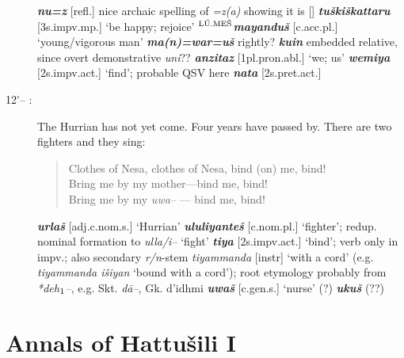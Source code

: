 \documentclass[10pt]{article}
\newcommand{\supersc}[1]{$^{\textrm{\scriptsize{#1}}}$}  	%
\newcommand{\subsc}[1]{$_{\textrm{\scriptsize{#1}}}$}	%
\newcommand{\bit}[1]{\textbf{\textit{#1}}}				%
\newcommand{\p}[1]{{\tiny[{#1}]}}					%
\newcommand{\hi}{h\subsc{1}}								%
\newcommand{\pr}{\'{ }}									%
\newcommand{\hith}{\textsubwedge{h}}
\newcommand{\men}{\supersc{L\'U.ME\v{S}}}
\renewcommand{\.}[1]{\textsubdot{#1}}
\begin{document}
\begin{description}
\begin{notes}

\bit{nu=z} \p{refl.} nice archaic spelling of \textit{=z(a)} showing it is [\texttslig] \bit{tu\v{s}ki\v{s}kattaru} \p{3s.impv.mp.} `be happy; rejoice' \textbf{\men}\bit{mayandu\v{s}} \p{c.acc.pl.} `young/vigorous man' \bit{ma(n)=war=u\v{s}} rightly? \bit{kuin} embedded relative, since overt demonstrative \textit{uni}?? \bit{anzitaz} \p{1pl.pron.abl.} `we; us' \bit{wemiya} \p{2s.impv.act.} `find'; probable QSV here  \bit{na{\hith}ta} \p{2s.pret.act.}

\end{notes}

\item[12{\pr}-- :] The Hurrian has not yet come. Four years have passed by. There are two fighters and they sing:

\begin{verse}
Clothes of Nesa, clothes of Nesa, bind (on) me, bind! \\
Bring me by my mother---bind me, bind! \\
Bring me by my \textit{uwa--} --- bind me, bind! \\
\end{verse}


\begin{notes}

\bit{{\hith}urla\v{s}} \p{adj.c.nom.s.} `Hurrian' \bit{{\hith}ul{\hith}uliyante\v{s}} \p{c.nom.pl.} `fighter'; redup. nominal formation to \textit{{\hith}ulla/i--} `fight' \bit{tiya} \p{2s.impv.act.} `bind'; verb only in impv.; also secondary \textit{r/n}-stem \textit{tiyammanda} \p{instr} `with a cord' (e.g. \textit{tiyammanda i\v{s}{\hith}iyan} `bound with a cord'); root etymology probably from \textit{*de{\hi}--}, e.g. Skt. \textit{d\=a--}, Gk. {\greektext d'idhmi} \bit{uwa\v{s}} \p{c.gen.s.} `nurse' (?) \bit{uku\v{s}} (??) 



\end{notes}



\end{description}



\section{Annals of Hattu\v{s}ili I}
\end{document}
